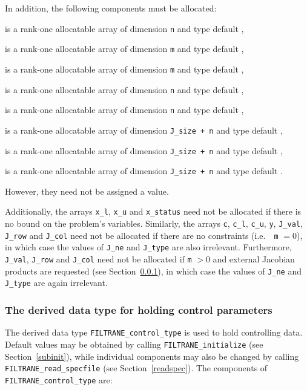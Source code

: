 \documentclass{galahad}
\newcommand{\packagename}{FILTRANE}
\begin{document}
\noindent
In addition, the following components must be allocated:
\begin{description}
 is a rank-one allocatable array of dimension {\tt n} and type
default \integer,

 is a rank-one allocatable array of dimension {\tt m} and type
default \realdp,

 is a rank-one allocatable array of dimension {\tt m} and type
default \realdp,

 is a rank-one allocatable array of dimension {\tt n} and type
default \realdp,

 is a rank-one allocatable array of dimension {\tt n} and type
default \logical,

 is a rank-one allocatable array of dimension {\tt J\_size + n} and
type default \realdp,

 is a rank-one allocatable array of dimension {\tt J\_size + n} and
type default \integer,

 is a rank-one allocatable array of dimension {\tt J\_size + n} and
type default \integer.
\end{description}
However, they need not be assigned a value.

\noindent
Additionally, the arrays {\tt x\_l}, {\tt x\_u} and {\tt x\_status} need not
be allocated if there is no bound on the problem's variables.  Similarly, the
arrays {\tt c}, {\tt c\_l}, {\tt c\_u}, {\tt y}, {\tt J\_val}, {\tt J\_row}
and {\tt J\_col} need not be allocated if there are no constraints (i.e.\ {\tt
m} $=0$), in which case the values of {\tt J\_ne} and {\tt J\_type} are also
irrelevant. Furthermore, {\tt J\_val}, {\tt J\_row} and {\tt J\_col} need not
be allocated if {\tt m} $>0$ and external Jacobian products are requested (see
Section~\ref{typecontrol}), in which case the values of {\tt J\_ne} and {\tt
J\_type} are again irrelevant.


\subsubsection{The derived data type for holding control
 parameters}\label{typecontrol}
The derived data type
{\tt \packagename\_control\_type}
is used to hold controlling data. Default values may be obtained by calling
{\tt \packagename\_initialize} (see Section~\ref{subinit}),
while individual components may also be changed by calling
{\tt \packagename\_read\-\_specfile}
(see Section~\ref{readspec}).
The components of
{\tt \packagename\_control\_type}
are:
\end{document}

